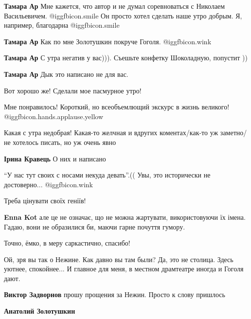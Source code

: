 \begin{itemize}
\begin{itemize}
\textbf{Тамара Ар} Мне кажется, что автор и не думал соревноваться с Николаем Васильевичем. @igg{fbicon.smile}  Он просто хотел сделать наше утро добрым. Я, например, благодарна @igg{fbicon.smile} 

\textbf{Тамара Ар} Как по мне Золотушкин покруче Гоголя.  @igg{fbicon.wink} 

\textbf{Тамара Ар} С утра негатив у вас))). Съешьте конфетку Шоколадную, попустит ))

\textbf{Тамара Ар} Дык это написано не для вас.

\end{itemize} %

Вот хорошо же!
Сделали мое пасмурное утро!

Мне понравилось! Короткий, но всеобъемлющий экскурс в жизнь великого! @igg{fbicon.hands.applause.yellow} 

Какая с утра недобрая! Какая-то желчная и вдругих коментах/как-то уж заметно/не
хотелось писать, но уж очень явно

\begin{itemize} %
\textbf{Ірина Кравець} О них и написано
\end{itemize} %

\enquote{У нас тут своих с носами некуда девать}.(( Увы, это исторически не
достоверно... @igg{fbicon.wink} 

Треба цінувати своїх геніїв!

\begin{itemize} %
\textbf{Enna Kot} але це не означає, що не можна жартувати, використовуючи їх імена. Гадаю, вони не образилися би, маючи гарне почуття гумору.
\end{itemize} %

Точно, ёмко, в меру саркастично, спасибо!


Ой, зря вы так о Нежине. Как давно вы там были? Да, это не столица. Здесь
уютнее, спокойнее... И главное для меня, в местном драмтеатре иногда и Гоголя
дают.

\begin{itemize} %
\textbf{Виктор Задворнов} прошу прощения за Нежин. Просто к слову пришлось

\begin{itemize} %
\textbf{Анатолий Золотушкин} 


\end{itemize}
\end{itemize}
\end{itemize}
